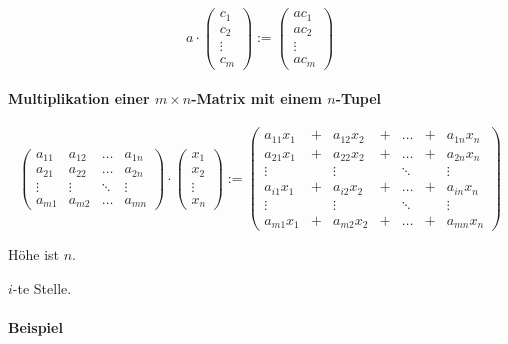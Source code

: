 \documentclass[a4paper,12pt]{article}
\begin{document}
$$a\cdot\begin{pmatrix}
    c_1 \\ c_2 \\ \vdots \\ c_m
  \end{pmatrix}:=\begin{pmatrix}
    ac_1 \\ ac_2 \\ \vdots \\ ac_m
  \end{pmatrix}$$

\paragraph{Multiplikation einer $m\times n$-Matrix mit einem $n$-Tupel}

$$\begin{pmatrix}
    a_{11} & a_{12} & \dots  & a_{1n} \\
    a_{21} & a_{22} & \dots  & a_{2n} \\
    \vdots & \vdots & \ddots & \vdots \\
    a_{m1} & a_{m2} & \dots  & a_{mn}
  \end{pmatrix}\cdot\begin{pmatrix}
    x_{1} \\ x_{2} \\ \vdots \\ x_{n}
  \end{pmatrix}:=\begin{pmatrix}
    a_{11}x_{1} & + & a_{12}x_{2} & + & \dots  & + & a_{1n}x_{n} \\
    a_{21}x_{1} & + & a_{22}x_{2} & + & \dots  & + & a_{2n}x_{n} \\
    \vdots      &   & \vdots      &   & \ddots &   & \vdots      \\
    a_{i1}x_{1} & + & a_{i2}x_{2} & + & \dots  & + & a_{in}x_{n} \\
    \vdots      &   & \vdots      &   & \ddots &   & \vdots      \\
    a_{m1}x_{1} & + & a_{m2}x_{2} & + & \dots  & + & a_{mn}x_{n}
  \end{pmatrix}$$

Höhe ist $n$.

$i$-te Stelle.

\paragraph*{Beispiel}
\end{document}
